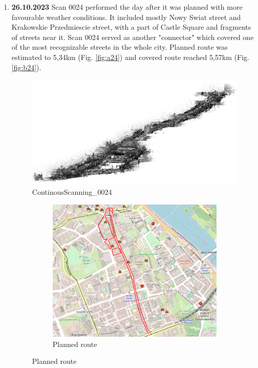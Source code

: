 \documentclass[a4paper,12pt]{book}
\begin{document}
\begin{enumerate}
	\item \textbf{26.10.2023} Scan 0024 performed the day after it was planned with more favourable weather conditions. It included mostly Nowy Swiat street and Krakowskie Przedmiescie street, with a part of Castle Square and fragments of streets near it. Scan 0024 served as another "connector" which covered one of the most recognizable streets in the whole city. Planned route was estimated to 5,34km (Fig. \ref{fig:a24}) and covered route reached 5,57km (Fig. \ref{fig:b24}).
	\begin{figure}[H]
		\includegraphics[width=1\linewidth]{cloud24}
		\caption{ContinousScanning\_0024}
	\end{figure}
	\begin{figure}[H]
		\centering
		\begin{subfigure}{.80\textwidth}
			\centering
			\includegraphics[width=1\linewidth]{route_p24}
			\caption{Planned route}

\end{subfigure}
\end{figure}
\end{enumerate}
\end{document}

